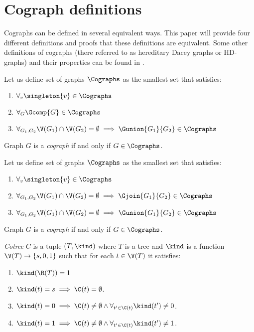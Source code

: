 
\section{Cograph definitions}

Cographs can be defined in several equivalent ways. This paper will provide four different definitions and proofs that these definitions are equivalent. Some other definitions of cographs (there referred to as hereditary Dacey graphs or HD-graphs) and their properties can be found in \cite{sumner}.

\begin{defi}\label{codef1}
    Let us define set of graphs $\Cographs$ as the smallest set that satisfies:
    \begin{enumerate}
        \item $\forall_v \singleton{v} \in \Cographs$
        \item $\forall_G \Gcomp{G} \in \Cographs$
        \item $\forall_{G_1, G_2} \V(G_1) \cap \V(G_2) = \emptyset \implies \Gunion{G_1}{G_2} \in \Cographs$
    \end{enumerate}
    Graph $G$ is a \emph{cograph} if and only if $G \in \Cographs$.
\end{defi}
\begin{defi}\label{codef2}
    Let us define set of graphs $\Cographs$ as the smallest set that satisfies:
    \begin{enumerate}
        \item $\forall_v \singleton{v} \in \Cographs$
        \item $\forall_{G_1, G_2} \V(G_1) \cap \V(G_2) = \emptyset \implies \Gjoin{G_1}{G_2} \in \Cographs$
        \item $\forall_{G_1, G_2} \V(G_1) \cap \V(G_2) = \emptyset \implies \Gunion{G_1}{G_2} \in \Cographs$
    \end{enumerate}
    Graph $G$ is a \emph{cograph} if and only if $G \in \Cographs$.
\end{defi}

\begin{defi}
    \emph{Cotree} $C$ is a tuple $(T, \kind)$ where $T$ is a tree and $\kind$ is a function $\V(T) \to \{s,0,1\}$ such that for each $t \in \V(T)$ it satisfies:
    \begin{enumerate}
        \item $\kind(\R(T)) = 1$
        \item $\kind(t) = s \implies \C(t) = \emptyset$.
        \item $\kind(t) = 0 \implies \C(t) \neq \emptyset \land \forall_{t' \in \C(t)} \kind(t') \neq 0$.
        \item $\kind(t) = 1 \implies \C(t) \neq \emptyset \land \forall_{t' \in \C(t)} \kind(t') \neq 1$.
    \end{enumerate}
\end{defi}

